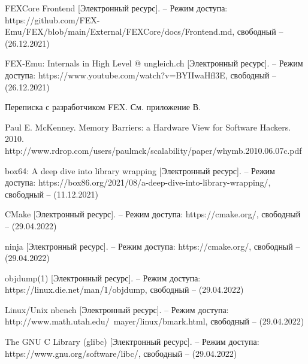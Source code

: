 \begin{thebibliography}{}
FEXCore Frontend [Электронный ресурс]. -- Режим доступа: 	https://github.com/FEX-Emu/FEX/blob/main/External/FEXCore/docs/Frontend.md,
свободный -- (26.12.2021)	

FEX-Emu: Internals in High Level @ ungleich.ch [Электронный ресурс]. -- Режим доступа: 		https://www.youtube.com/watch?v=BYIIwaHfl3E,
свободный -- (26.12.2021)

Переписка с разработчиком FEX. См. приложение В.

	Paul E. McKenney. Memory Barriers: a Hardware View for Software Hackers. 2010. http://www.rdrop.com/users/paulmck/scalability/paper/whymb.2010.06.07c.pdf
	
	
box64: A deep dive into library wrapping [Электронный ресурс]. -- Режим доступа: https://box86.org/2021/08/a-deep-dive-into-library-wrapping/,
свободный -- (11.12.2021)
	

	CMake [Электронный ресурс]. -- Режим доступа: https://cmake.org/, свободный -- (29.04.2022)

	ninja [Электронный ресурс]. -- Режим доступа: https://cmake.org/, свободный -- (29.04.2022)


	objdump(1) [Электронный ресурс]. -- Режим доступа: https://linux.die.net/man/1/objdump, свободный -- (29.04.2022)


	Linux/Unix nbench [Электронный ресурс]. -- Режим доступа: http://www.math.utah.edu/~mayer/linux/bmark.html, свободный -- (29.04.2022)
	
	The GNU C Library (glibc) [Электронный ресурс]. -- Режим доступа: https://www.gnu.org/software/libc/, свободный -- (29.04.2022)


	
\end{thebibliography}
\endgroup

\pagebreak